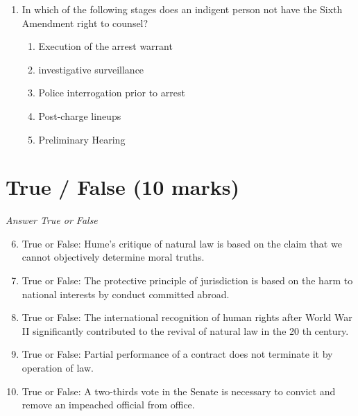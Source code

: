 \documentclass[12pt]{article}
\begin{document}
\begin{enumerate}[label=\arabic*.]
\begin{enumerate}[label=(\alph*)]
    \item Because the concept of punishment has evolved over time.
    \item Because punishment can be justified in multiple ways.
    \item Because any definition of punishment should be value-neutral.
    \item Because the practice of punishment is separate from its justification.
    \item Because the justification of punishment varies across cultures.
\end{enumerate}
\item In which of the following stages does an indigent person not have the Sixth Amendment right to counsel?
\begin{enumerate}[label=(\alph*)]
    \item Execution of the arrest warrant
    \item investigative surveillance
    \item Police interrogation prior to arrest
    \item Post-charge lineups
    \item Preliminary Hearing
\end{enumerate}
\end{enumerate}

\section*{True / False (10 marks)}
\textit{Answer True or False}
\begin{enumerate}[label=\arabic*.]
\setcounter{enumi}{5}
\item True or False: Hume's critique of natural law is based on the claim that we cannot objectively determine moral truths.
\item True or False: The protective principle of jurisdiction is based on the harm to national interests by conduct committed abroad.
\item True or False: The international recognition of human rights after World War II significantly contributed to the revival of natural law in the 20 th century.
\item True or False: Partial performance of a contract does not terminate it by operation of law.
\item True or False: A two-thirds vote in the Senate is necessary to convict and remove an impeached official from office.
\end{enumerate}
\end{document}
